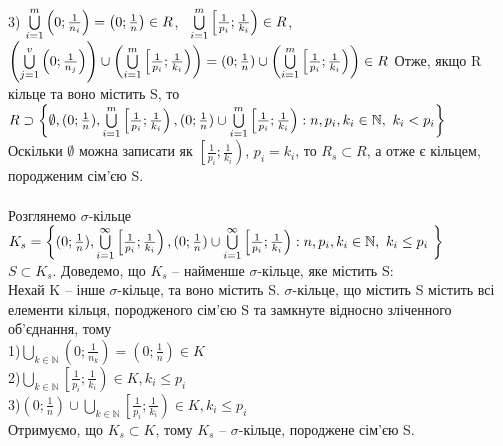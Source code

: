 \documentclass[12 pt]{article}
\begin{document}
3) $\bigcup_{i=1}^m\limits  \left(0;\frac{1}{n_i}\right) = \left(0; \frac{1}{n}\right) \in R$, \
$\bigcup_{i=1}^m\limits \left[\frac{1}{p_i}; \frac{1}{k_i}\right) \in R$, \ $
\left(\bigcup_{j=1}^v\limits \left(0;\frac{1}{n_j}\right)\right) \cup \left(\bigcup_{i=1}^m\limits \left[\frac{1}{p_i}; \frac{1}{k_i}\right)\right) = 
(0;\frac{1}{n}) \cup \left(\bigcup_{i=1}^m\limits \left[\frac{1}{p_i}; \frac{1}{k_i}\right)\right) \in R$ 
Отже, якщо R кільце та воно містить S, то \\ 
$R \supset \left\{ \emptyset, (0;\frac{1}{n}), 
\bigcup_{i=1}^m\limits \left[\frac{1}{p_i};\frac{1}{k_i}\right), 
(0;\frac{1}{n}) \cup  
\bigcup_{i=1}^m\limits \left[\frac{1}{p_i};\frac{1}{k_i}\right) :
n, p_i, k_i \in \mathbb{N}, \ k_i < p_i  \right\}$ \\ 
Оскільки $\emptyset$ можна записати як $\left[\frac{1}{p_i};\frac{1}{k_i}\right)$, $p_i=k_i$,  то $R_s \subset R$, а отже
є кільцем, породженим сім'єю S.   \\ \\ 
Розглянемо $\sigma$-кільце 
$K_s = \left\{ (0;\frac{1}{n}), 
\bigcup_{i=1}^{\infty}\limits \left[\frac{1}{p_i};\frac{1}{k_i}\right), 
(0;\frac{1}{n}) \cup  
\bigcup_{i=1}^{ \infty }\limits \left[\frac{1}{p_i};\frac{1}{k_i}\right) :
n, p_i, k_i \in \mathbb{N}, \ k_i \leq p_i \ \right\}$ \\ 
$S \subset K_s$. Доведемо, що $K_s$ -- найменше $\sigma$-кільце, яке містить S: \\
Нехай K -- інше $\sigma$-кільце, та воно містить S. $\sigma$-кільце, що містить S 
містить всі елементи кільця, породженого сім'єю S та замкнуте відносно зліченного об'єднання, тому \\ 
1)$\bigcup_{k \in \mathbb{N}}\limits (0; \frac{1}{n_k}) = (0; \frac{1}{n}) \in K$ \\ 
2)$\bigcup_{k \in \mathbb{N}}\limits \left[\frac{1}{p_i};\frac{1}{k_i}\right)\in K, k_i \leq p_i$ \\ 
3)$(0;\frac{1}{n}) \cup \bigcup_{k \in \mathbb{N}}\limits \left[\frac{1}{p_i};\frac{1}{k_i}\right)\in K, k_i \leq p_i$ \\ 
Отримуємо, що $K_s \subset K$, тому $K_s$ -- $\sigma$-кільце, породжене сім'єю S. 
\end{document}
